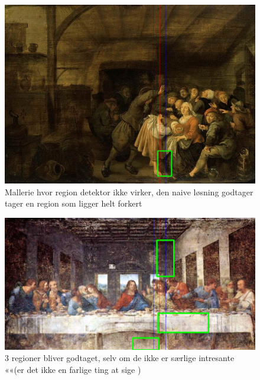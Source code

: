 \begin{figure}[h!!]
	\begin{center}
		\includegraphics[scale=0.3,angle=0]{afsnit/afprovning/billeder/naive_losning/naiv_virker_ikke1.png}
	\end{center}
	\caption[]{Mallerie hvor region detektor ikke virker, den naive løsning godtager tager en region som ligger helt forkert }
	\label{naiv_virker_ikke1}
\end{figure}

\begin{figure}[h!!]
	\begin{center}
		\includegraphics[scale=0.3,angle=0]{afsnit/afprovning/billeder/naive_losning/naiv_virker_ikke2.png}
	\end{center}
	\caption[]{3 regioner bliver godtaget, selv om de ikke er særlige intresante ««(er det ikke en farlige ting at sige )}
	\label{naiv_virker_ikke2}
\end{figure}

